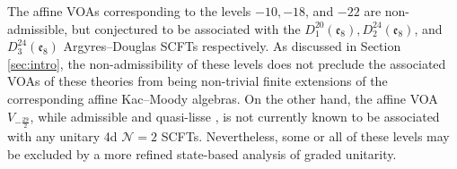 The affine VOAs corresponding to the levels $-10, -18$, and $-22$ are non-admissible, but conjectured to be associated with the $D_{1}^{20}(\mathfrak{e}_8), D_{2}^{24}(\mathfrak{e}_8)$, and $D_{3}^{24}(\mathfrak{e}_8)$ Argyres--Douglas SCFTs respectively. As discussed in Section \ref{sec:intro}, the non-admissibility of these levels does not preclude the associated VOAs of these theories from being non-trivial finite extensions of the corresponding affine Kac--Moody algebras. On the other hand, the affine VOA $V_{-\frac{29}{2}}$, while admissible and quasi-lisse \cite{Arakawa:2010ni, Arakawa:2016hkg}, is not currently known to be associated with any unitary 4d $\mathcal{N} = 2$ SCFTs. Nevertheless, some or all of these levels may be excluded by a more refined state-based analysis of graded unitarity.
